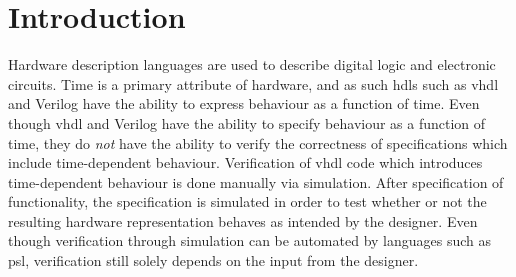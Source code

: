 \newcommand{\framedhslinecorrect}[2]%
  {#1[#2]}

\newcommand{\framedhs}{\sethscode{framedhscode}}


\newenvironment{inlinehscode}%
  {\(\def\column##1##2{}%
   \let\>\undefined\let\<\undefined\let\\\undefined
   \newcommand\>[1][]{}\newcommand\<[1][]{}\newcommand\\[1][]{}%
   \def\fromto##1##2##3{##3}%
   \def\nextline{}}{\) }%

\newcommand{\inlinehs}{\sethscode{inlinehscode}}


\newenvironment{joincode}%
  {\let\orighscode=\hscode
   \let\origendhscode=\endhscode
   \def\endhscode{\def\hscode{\endgroup\def\@currenvir{hscode}\\}\begingroup}
   \orighscode\def\hscode{\endgroup\def\@currenvir{hscode}}}%
  {\origendhscode
   \global\let\hscode=\orighscode
   \global\let\endhscode=\origendhscode}%

\makeatother
\EndFmtInput
%

\chapter{Introduction}
Hardware description languages are used to describe digital logic and electronic circuits.
Time is a primary attribute of hardware, and as such \glspl{hdl} such as \gls{vhdl}\cite{navabi1997vhdl} and Verilog\cite{thomas2002verilog} have the ability to express behaviour as a function of time.
Even though \gls{vhdl} and Verilog have the ability to specify behaviour as a function of time, they do \textit{not} have the ability to verify the correctness of specifications which include time-dependent behaviour.
Verification of \gls{vhdl} code which introduces time-dependent behaviour is done manually via simulation.
After specification of functionality, the specification is simulated in order to test whether or not the resulting hardware representation behaves as intended by the designer.
Even though verification through simulation can be automated by languages such as \gls{psl}\cite{eisner2006practical}, verification still solely depends on the input from the designer.

